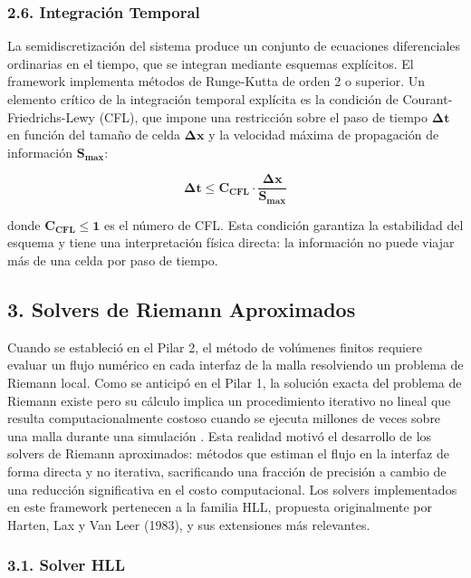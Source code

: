 \documentclass[11pt,openany]{book}
\begin{document}
\subsubsection{2.6. Integración Temporal}\textbf{}

La semidiscretización del sistema produce un conjunto de ecuaciones diferenciales ordinarias en el tiempo, que se integran mediante esquemas explícitos. El framework implementa métodos de Runge-Kutta de orden 2 o superior. Un elemento crítico de la integración temporal explícita es la condición de Courant-Friedrichs-Lewy (CFL), que impone una restricción sobre el paso de tiempo $\mathbf{\Delta t}$ en función del tamaño de celda $\mathbf{\Delta x}$ y la velocidad máxima de propagación de información $\mathbf{S_{max}}$:

\begin{equation}
    \mathbf{\Delta t \leq C_{CFL} \cdot \frac{\Delta x}{S_{max}}}
\end{equation}

donde $\mathbf{C_{CFL} \leq 1}$ es el número de CFL. Esta condición garantiza la estabilidad del esquema y tiene una interpretación física directa: la información no puede viajar más de una celda por paso de tiempo.

\subsection{3. Solvers de Riemann Aproximados}

Cuando se estableció en el Pilar 2, el método de volúmenes finitos requiere evaluar un flujo numérico en cada interfaz de la malla resolviendo un problema de Riemann local. Como se anticipó en el Pilar 1, la solución exacta del problema de Riemann existe pero su cálculo implica un procedimiento iterativo no lineal que resulta computacionalmente costoso cuando se ejecuta millones de veces sobre una malla durante una simulación \parencite{toro2013riemann}. Esta realidad motivó el desarrollo de los solvers de Riemann aproximados: métodos que estiman el flujo en la interfaz de forma directa y no iterativa, sacrificando una fracción de precisión a cambio de una reducción significativa en el costo computacional. Los solvers implementados en este framework pertenecen a la familia HLL, propuesta originalmente por Harten, Lax y Van Leer (1983), y sus extensiones más relevantes.

\subsubsection{3.1. Solver HLL}\textbf{}
\end{document}
